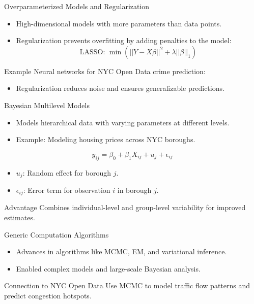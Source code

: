 \documentclass{beamer}
\begin{document}
\begin{frame}{Overparameterized Models and Regularization}
\begin{itemize}
    \item High-dimensional models with more parameters than data points.
    \item Regularization prevents overfitting by adding penalties to the model:
    \[
    \text{LASSO: } \min \left( ||Y - X\beta||^2 + \lambda ||\beta||_1 \right)
    \]
\end{itemize}

\begin{block}{Example}
Neural networks for NYC Open Data crime prediction:
\begin{itemize}
    \item Regularization reduces noise and ensures generalizable predictions.
\end{itemize}
\end{block}
\end{frame}

\begin{frame}{Bayesian Multilevel Models}
\begin{itemize}
    \item Models hierarchical data with varying parameters at different levels.
    \item Example: Modeling housing prices across NYC boroughs.
\end{itemize}

\[
y_{ij} = \beta_0 + \beta_1 X_{ij} + u_j + \epsilon_{ij}
\]
\begin{itemize}
    \item \( u_j \): Random effect for borough \( j \).
    \item \( \epsilon_{ij} \): Error term for observation \( i \) in borough \( j \).
\end{itemize}

\begin{block}{Advantage}
Combines individual-level and group-level variability for improved estimates.
\end{block}
\end{frame}

\begin{frame}{Generic Computation Algorithms}
\begin{itemize}
    \item Advances in algorithms like MCMC, EM, and variational inference.
    \item Enabled complex models and large-scale Bayesian analysis.
\end{itemize}

\begin{block}{Connection to NYC Open Data}
Use MCMC to model traffic flow patterns and predict congestion hotspots.
\end{block}
\end{frame}
\end{document}
